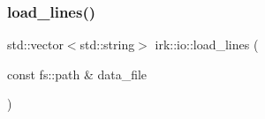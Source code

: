 \mbox{\label{namespaceirk_1_1io_af11c57444a8b26150af8c6cbaa8ef093}} 
\subsubsection{\texorpdfstring{load\+\_\+lines()}{load\_lines()}\hspace{0.1cm}{\footnotesize\ttfamily [2/2]}}
{\footnotesize\ttfamily std\+::vector$<$std\+::string$>$ irk\+::io\+::load\+\_\+lines (\begin{DoxyParamCaption}\item[{const fs\+::path \&}]{data\+\_\+file }\end{DoxyParamCaption})\hspace{0.3cm}{\ttfamily [inline]}}

